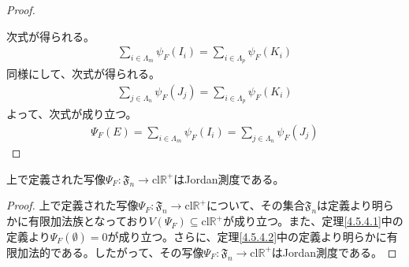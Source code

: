 \documentclass[dvipdfmx]{jsarticle}
\begin{document}
\begin{proof}
\begin{center}
\end{center}
次式が得られる。
\begin{align*}
\sum_{i \in \varLambda_{m}} {\psi_{F}\left( I_{i} \right)} = \sum_{i \in \varLambda_{p}} {\psi_{F}\left( K_{i} \right)}
\end{align*}
同様にして、次式が得られる。
\begin{align*}
\sum_{j \in \varLambda_{n}} {\psi_{F}\left( J_{j} \right)} = \sum_{i \in \varLambda_{p}} {\psi_{F}\left( K_{i} \right)}
\end{align*}
よって、次式が成り立つ。
\begin{align*}
\varPsi_{F}(E) = \sum_{i \in \varLambda_{m}} {\psi_{F}\left( I_{i} \right)} = \sum_{j \in \varLambda_{n}} {\psi_{F}\left( J_{j} \right)}
\end{align*}
\end{proof}
\begin{thm}\label{4.5.4.4}
上で定義された写像$\varPsi_{F}:\mathfrak{F}_{n} \rightarrow \mathrm{cl}\mathbb{R}^{+}$はJordan測度である。
\end{thm}
\begin{proof}
上で定義された写像$\varPsi_{F}:\mathfrak{F}_{n} \rightarrow \mathrm{cl}\mathbb{R}^{+}$について、その集合$\mathfrak{F}_{n}$は定義より明らかに有限加法族となっており$V\left( \varPsi_{F} \right) \subseteq \mathrm{cl}\mathbb{R}^{+}$が成り立つ。また、定理\ref{4.5.4.1}中の定義より$\varPsi_{F}(\emptyset) = 0$が成り立つ。さらに、定理\ref{4.5.4.2}中の定義より明らかに有限加法的である。したがって、その写像$\varPsi_{F}:\mathfrak{F}_{n} \rightarrow \mathrm{cl}\mathbb{R}^{+}$はJordan測度である。
\end{proof}
\end{document}

